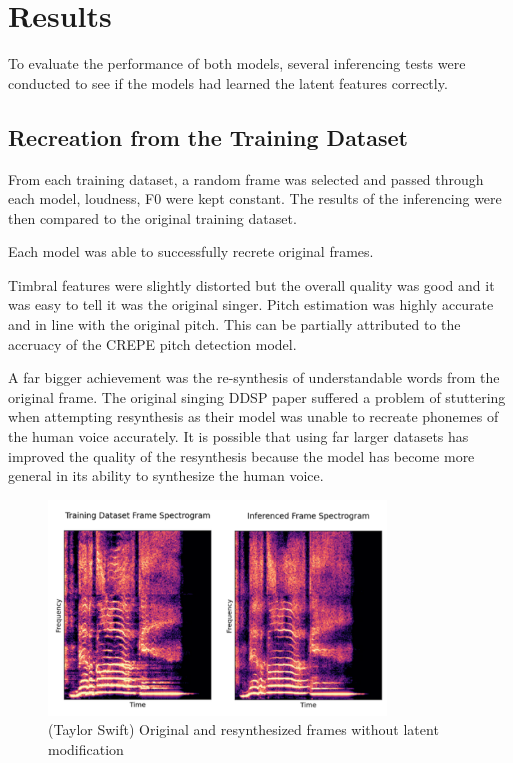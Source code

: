 \section{Results}

To evaluate the performance of both models, several inferencing tests were conducted to see if the models had learned the latent features correctly.

\subsection{Recreation from the Training Dataset}

From each training dataset, a random frame was selected and passed through each model, loudness, F0 were kept constant. The results of the inferencing were then compared to the original training dataset.

Each model was able to successfully recrete original frames.

Timbral features were slightly distorted but the overall quality was good and it was easy to tell it was the original singer. Pitch estimation was highly accurate and in line with the original pitch. This can be partially attributed to the accruacy of the CREPE pitch detection model\cite{CREPE}.

A far bigger achievement was the re-synthesis of understandable words from the original frame. The original singing DDSP paper\cite{SingingDDSP} suffered a problem of stuttering when attempting resynthesis as their model was unable to recreate phonemes of the human voice accurately. It is possible that using far larger datasets has improved the quality of the resynthesis because the model has become more general in its ability to synthesize the human voice.

\begin{figure}[!ht]
    \centering
    \includegraphics[width=0.8\textwidth]{research/results/TaylorSwift/InferredRecreation.png}
    \caption{(Taylor Swift) Original and resynthesized frames without latent modification}
\end{figure}


